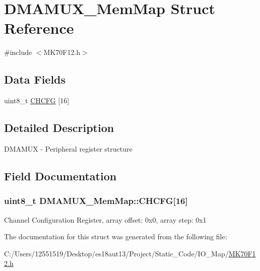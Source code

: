 \hypertarget{struct_d_m_a_m_u_x___mem_map}{}\section{D\+M\+A\+M\+U\+X\+\_\+\+Mem\+Map Struct Reference}
\label{struct_d_m_a_m_u_x___mem_map}


{\ttfamily \#include $<$M\+K70\+F12.\+h$>$}

\subsection*{Data Fields}
\begin{DoxyCompactItemize}
\item 
uint8\+\_\+t \hyperlink{struct_d_m_a_m_u_x___mem_map_a7ba04adde18230ace5b01e6b01725638}{C\+H\+C\+F\+G} \mbox{[}16\mbox{]}
\end{DoxyCompactItemize}


\subsection{Detailed Description}
D\+M\+A\+M\+U\+X -\/ Peripheral register structure 

\subsection{Field Documentation}
\hypertarget{struct_d_m_a_m_u_x___mem_map_a7ba04adde18230ace5b01e6b01725638}{}
\subsubsection[{C\+H\+C\+F\+G}]{\setlength{\rightskip}{0pt plus 5cm}uint8\+\_\+t D\+M\+A\+M\+U\+X\+\_\+\+Mem\+Map\+::\+C\+H\+C\+F\+G\mbox{[}16\mbox{]}}\label{struct_d_m_a_m_u_x___mem_map_a7ba04adde18230ace5b01e6b01725638}
Channel Configuration Register, array offset\+: 0x0, array step\+: 0x1 

The documentation for this struct was generated from the following file\+:\begin{DoxyCompactItemize}
\item 
C\+:/\+Users/12551519/\+Desktop/es18aut13/\+Project/\+Static\+\_\+\+Code/\+I\+O\+\_\+\+Map/\hyperlink{_m_k70_f12_8h}{M\+K70\+F12.\+h}\end{DoxyCompactItemize}
